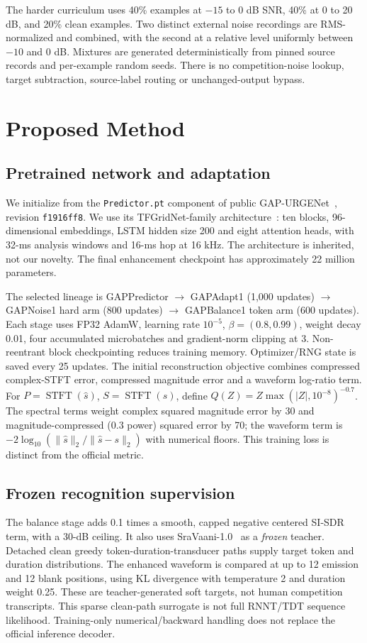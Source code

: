 \documentclass[conference]{IEEEtran}
\begin{document}
The harder curriculum uses 40\% examples at $-15$ to 0 dB SNR, 40\% at 0 to 20 dB, and 20\% clean examples. Two distinct external noise recordings are RMS-normalized and combined, with the second at a relative level uniformly between $-10$ and 0 dB. Mixtures are generated deterministically from pinned source records and per-example random seeds. There is no competition-noise lookup, target subtraction, source-label routing or unchanged-output bypass.

\section{Proposed Method}
\subsection{Pretrained network and adaptation}
We initialize from the \texttt{Predictor.pt} component of public GAP-URGENet~\cite{gap}, revision \texttt{f1916ff8}. We use its TFGridNet-family architecture~\cite{tfgrid}: ten blocks, 96-dimensional embeddings, LSTM hidden size 200 and eight attention heads, with 32-ms analysis windows and 16-ms hop at 16 kHz. The architecture is inherited, not our novelty. The final enhancement checkpoint has approximately 22 million parameters.

The selected lineage is GAPPredictor $\rightarrow$ GAPAdapt1 (1,000 updates) $\rightarrow$ GAPNoise1 hard arm (800 updates) $\rightarrow$ GAPBalance1 token arm (600 updates). Each stage uses FP32 AdamW, learning rate $10^{-5}$, $\beta=(0.8,0.99)$, weight decay 0.01, four accumulated microbatches and gradient-norm clipping at 3. Non-reentrant block checkpointing reduces training memory. Optimizer/RNG state is saved every 25 updates. The initial reconstruction objective combines compressed complex-STFT error, compressed magnitude error and a waveform log-ratio term. For $P=\operatorname{STFT}(\hat{s})$, $S=\operatorname{STFT}(s)$, define $Q(Z)=Z\max(|Z|,10^{-8})^{-0.7}$. The spectral terms weight complex squared magnitude error by 30 and magnitude-compressed ($0.3$ power) squared error by 70; the waveform term is $-2\log_{10}(\|\hat{s}\|_2/\|\hat{s}-s\|_2)$ with numerical floors. This training loss is distinct from the official metric.

\subsection{Frozen recognition supervision}
The balance stage adds 0.1 times a smooth, capped negative centered SI-SDR term, with a 30-dB ceiling. It also uses SraVaani-1.0~\cite{sravaani} as a \emph{frozen} teacher. Detached clean greedy token-duration-transducer paths supply target token and duration distributions. The enhanced waveform is compared at up to 12 emission and 12 blank positions, using KL divergence with temperature 2 and duration weight 0.25. These are teacher-generated soft targets, not human competition transcripts. This sparse clean-path surrogate is not full RNNT/TDT sequence likelihood. Training-only numerical/backward handling does not replace the official inference decoder.
\end{document}
